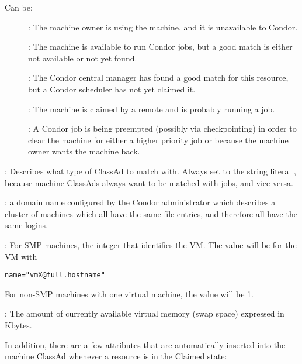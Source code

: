 \begin{description}
Can be:
	\begin{description}
	\item[] : The machine owner is using the machine, and
it is unavailable to Condor.
	\item[] : The machine is available to run Condor jobs,
but a good match is either not available or not 
yet found.
	\item[] : The Condor central manager has found a good
match for this resource, but a Condor scheduler has not yet claimed it.
	\item[] : The machine is claimed by a remote
 and is probably running a job.
	\item[] : A Condor job is being preempted (possibly
via checkpointing) in order to clear the machine for either a higher
priority job or because the machine owner wants the machine back.
	\end{description}   %
%
\item[\AdAttr{TargetType}] : Describes what type of ClassAd to match with.
Always set to the string literal , because machine ClassAds
always want to be matched with jobs, and vice-versa.
%
\item[\AdAttr{UidDomain}] : a domain name configured by the Condor 
administrator which describes a cluster of machines which all have 
the same  file entries, and therefore all have the same logins.
%
\item[\AdAttr{VirtualMachineID}] : For SMP machines, the integer
that identifies the VM.
The value will be \verb@X@ for the VM with 
\begin{verbatim}
name="vmX@full.hostname"
\end{verbatim}
For non-SMP machines with one virtual machine, the value will be 1.
%
\item[\AdAttr{VirtualMemory}] : The amount of currently available virtual memory 
(swap space) expressed in Kbytes.

\end{description}

In addition, there are a few attributes that are automatically
inserted into the machine ClassAd whenever a resource is in the
Claimed state:

